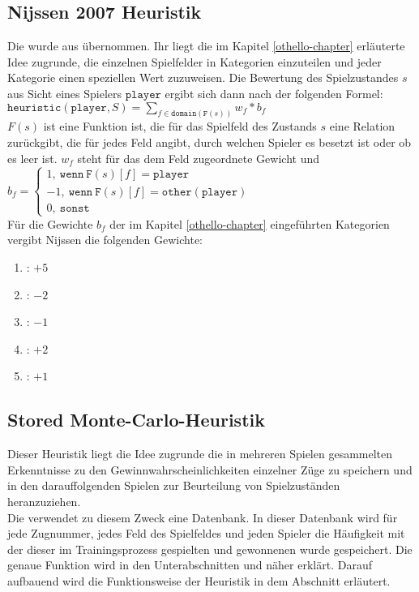 \subsection{Nijssen 2007 Heuristik}
\label{nissen2007H}
Die  wurde aus \cite{nijssen_2007} übernommen. Ihr liegt die im Kapitel \ref{othello-chapter} erläuterte Idee zugrunde, die einzelnen Spielfelder in Kategorien einzuteilen und jeder Kategorie einen speziellen Wert zuzuweisen. Die Bewertung des Spielzustandes $s$ aus Sicht eines Spielers $\mathtt{player}$ ergibt sich dann nach der folgenden Formel:  \vspace{0.25cm}\\ $\mathtt{heuristic}(\mathtt{player}, S) = \sum\limits_{f \in \mathtt{domain}(\mathtt{F}(s))}  w_{f} * b_{f}$ \vspace{0.25cm}\\$F(s)$ ist eine Funktion ist, die für das Spielfeld des Zustands $s$ eine Relation zurückgibt, die für jedes Feld angibt, durch welchen Spieler es besetzt ist oder ob es leer ist. $w_{f}$ steht für das dem Feld zugeordnete Gewicht und \vspace{0.25cm}\\$b_{f} = \begin{cases} 1 \mathtt{,\ wenn\ F}(s)[f] = \mathtt{player} \\ -1 \mathtt{,\ wenn\ F}(s)[f] = \mathtt{other(player)} \\ 0 \mathtt{,\ sonst} \end{cases}$
\vspace{0.25cm}\\Für die Gewichte $b_{f}$ der im Kapitel \ref{othello-chapter} eingeführten Kategorien vergibt Nijssen die folgenden Gewichte:
\begin{enumerate}
\item {}: $+5$
\item {}: $-2$
\item {}: $-1$
\item {}: $+2$
\item {}: $+1$
\end{enumerate}
\subsection{Stored Monte-Carlo-Heuristik}
\label{impl:stored-mc}
\authorpatrick
Dieser Heuristik liegt die Idee zugrunde die in mehreren Spielen gesammelten Erkenntnisse zu den Gewinnwahrscheinlichkeiten einzelner Züge zu speichern und in den darauffolgenden Spielen zur Beurteilung von Spielzuständen heranzuziehen.
\\Die {} verwendet zu diesem Zweck eine Datenbank. In dieser Datenbank wird für jede Zugnummer, jedes Feld des Spielfeldes und jeden Spieler die Häufigkeit mit der dieser im Trainingsprozess gespielten und gewonnenen wurde gespeichert. Die genaue Funktion wird in den Unterabschnitten  und  näher erklärt. Darauf aufbauend wird die Funktionsweise der Heuristik in dem Abschnitt  erläutert.
